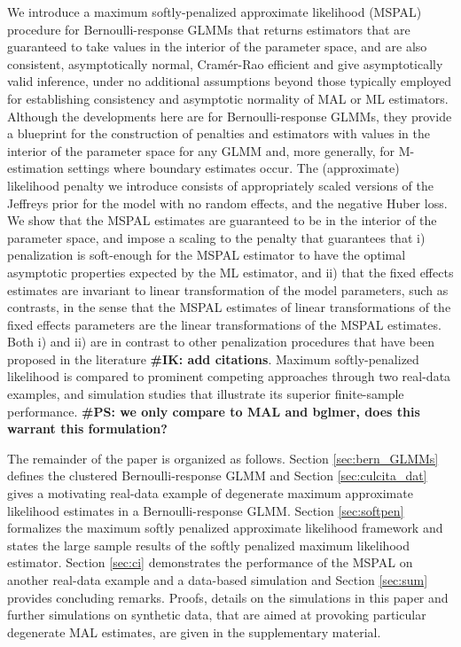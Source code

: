 \documentclass[11pt, a4paper]{article}
\newcommand{\IK}[1]{{\noindent \color{blue} \bf \#IK: #1}}
\newcommand{\PS}[1]{{\noindent \color{red} \bf \#PS: #1}}
\theoremstyle{example} \newtheorem{example}{Example}[section]
\theoremstyle{theorem} \newtheorem{theorem}{Theorem}[section]
\begin{document}
We introduce a maximum softly-penalized approximate likelihood (MSPAL)
procedure for Bernoulli-response GLMMs that returns estimators that
are guaranteed to take values in the interior of the parameter space,
and are also consistent, asymptotically normal, Cram\'{e}r-Rao
efficient and give asymptotically valid inference, under no additional assumptions beyond those typically
employed for establishing consistency and asymptotic normality of MAL
or ML estimators. Although the developments here are for
Bernoulli-response GLMMs, they provide a blueprint for the
construction of penalties and estimators with values in the interior
of the parameter space for any GLMM and, more generally, for
M-estimation settings where boundary estimates occur. The
(approximate) likelihood penalty we introduce consists of
appropriately scaled versions of the Jeffreys prior for the model with
no random effects, and the negative Huber loss. We show that the MSPAL
estimates are guaranteed to be in the interior of the parameter space,
and impose a scaling to the penalty
that guarantees that i) penalization is soft-enough for the MSPAL
estimator to have the optimal asymptotic properties expected by the ML
estimator, and ii) that the fixed effects estimates are invariant to linear
transformation of the model parameters, such as contrasts, in the
sense that the MSPAL estimates of linear transformations of the fixed
effects parameters are the linear transformations of the MSPAL
estimates. Both i) and ii) are in contrast to other penalization
procedures that have been proposed in the literature \citep[see, for
example,][]{blme, chung+etal:2015} \IK{add citations}. Maximum
softly-penalized likelihood is compared to prominent competing
approaches through two real-data examples, and
simulation studies that illustrate its superior finite-sample
performance. \PS{we only compare to MAL and bglmer, does this warrant this formulation?}

The remainder of the paper is organized as follows. Section \ref{sec:bern_GLMMs} defines the clustered
Bernoulli-response GLMM and Section \ref{sec:culcita_dat} gives a motivating real-data example of
degenerate maximum approximate likelihood estimates in a Bernoulli-response GLMM. Section
\ref{sec:softpen} formalizes the maximum softly penalized approximate likelihood framework and
states the large sample results of the softly penalized maximum
likelihood estimator. Section \ref{sec:ci} demonstrates the performance of the MSPAL on another real-data example and a data-based simulation and Section \ref{sec:sum} provides concluding remarks. Proofs, details on the simulations in this paper and further simulations on synthetic data, that are aimed at provoking particular degenerate MAL estimates, are given in the supplementary material. 
\end{document}
